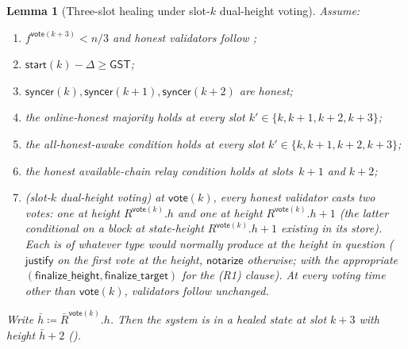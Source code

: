 \documentclass{article}
\newcommand{\just}{\ensuremath{\mathsf{justify}}\xspace}
\newcommand{\notar}{\ensuremath{\mathsf{notarize}}\xspace}
\newcommand{\finalizeHeight}{\mathsf{finalize\_height}}
\newcommand{\finalizeTarget}{\mathsf{finalize\_target}}
\newcommand{\syncer}{\mathsf{syncer}}
\newcommand{\start}{\mathsf{start}}
\newcommand{\vote}{\mathsf{vote}}
\newcommand{\comm}[1]{\bar{#1}}
\theoremstyle{plain}
\newtheorem{lemma}{Lemma}
\theoremstyle{definition}
\theoremstyle{remark}
\newcommand{\GST}{\ensuremath{\mathsf{GST}}}
\newcommand{\OHM}{online-honest majority\xspace}
\newcommand{\HAR}{honest available-chain relay\xspace}
\newcommand{\AHA}{all-honest-awake\xspace}
\begin{document}
\begin{lemma}[Three-slot healing under slot-$k$ dual-height voting]\label{rev:lem:healing-three-slot-dual-vote}
Assume:
\begin{enumerate}
  \item $f^{\vote(k+3)} < n/3$ and honest validators follow ;
  \item $\start(k) - \Delta \geq \GST$;
  \item $\syncer(k), \syncer(k+1), \syncer(k+2)$ are honest;
  \item the \OHM holds at every slot $k' \in \{k, k+1, k+2, k+3\}$;
  \item the \AHA condition holds at every slot $k' \in \{k, k+1, k+2, k+3\}$;
  \item the \HAR condition holds at slots~$k+1$ and $k+2$;
  \item (\emph{slot-$k$ dual-height voting}) at $\vote(k)$, every honest validator casts \emph{two} votes: one at height $R^{\vote(k)}.h$ and one at height $R^{\vote(k)}.h + 1$ (the latter conditional on a block at state-height $R^{\vote(k)}.h + 1$ existing in its store). Each is of whatever type  would normally produce at the height in question (\just on the first vote at the height, \notar otherwise; with the appropriate $(\finalizeHeight, \finalizeTarget)$ for the (R1) clause). At every voting time other than $\vote(k)$, validators follow  unchanged.
\end{enumerate}
Write $\comm{h} \coloneqq \comm{R}^{\vote(k)}.h$. Then the system is in a healed state at slot $k+3$ with height $\comm{h}+2$ ().
\end{lemma}
\end{document}
